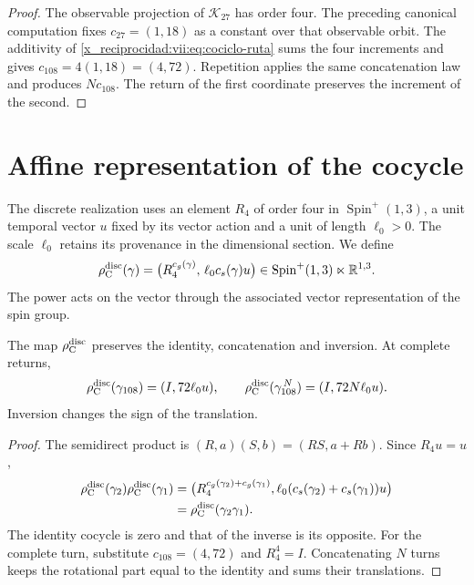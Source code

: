 \begin{proof}
The observable projection of \(\mathcal K_{27}\) has order four.
The preceding canonical computation fixes \(c_{27}=(1,18)\) as a constant
over that observable orbit. The additivity of
\eqref{x_reciprocidad:vii:eq:cociclo-ruta} sums the four increments and gives
\(c_{108}=4(1,18)=(4,72)\).
Repetition applies the same concatenation law and produces
\(Nc_{108}\). The return of the first coordinate preserves the
increment of the second.
\end{proof}

\section{Affine representation of the cocycle}
\label{x_reciprocidad:vii:subsec:representacion-afin-cociclo}

The discrete realization uses an element \(R_4\) of order four in
\(\operatorname{Spin}^+(1,3)\), a unit temporal vector \(u\)
fixed by its vector action and a unit of length \(\ell_0>0\).
The scale \(\ell_0\) retains its provenance in the dimensional section.
We define
\begin{equation}
 \rho_{\rm C}^{\rm disc}(\gamma)=
 \bigl(R_4^{c_g(\gamma)},\,\ell_0c_s(\gamma)u\bigr)
 \in\operatorname{Spin}^+(1,3)\ltimes\mathbb R^{1,3}.
 \label{x_reciprocidad:vii:eq:representacion-discreta-memoria}
\end{equation}
The power acts on the vector through the associated vector
representation of the spin group.

\begin{theorem}
\label{x_reciprocidad:vii:thm:traslacion-memoria}
The map \(\rho_{\rm C}^{\rm disc}\) preserves the identity,
concatenation and inversion. At complete returns,
\begin{equation}
 \rho_{\rm C}^{\rm disc}(\gamma_{108})=(I,72\ell_0u),\qquad
 \rho_{\rm C}^{\rm disc}(\gamma_{108}^{\,N})=(I,72N\ell_0u).
 \label{x_reciprocidad:vii:eq:traslacion-retorno-108}
\end{equation}
Inversion changes the sign of the translation.
\end{theorem}

\begin{proof}
The semidirect product is
\((R,a)(S,b)=(RS,a+Rb)\). Since \(R_4u=u\),
\[
\begin{split}
 \rho_{\rm C}^{\rm disc}(\gamma_2)
 \rho_{\rm C}^{\rm disc}(\gamma_1)
 &=
 \bigl(R_4^{c_g(\gamma_2)+c_g(\gamma_1)},
 \ell_0(c_s(\gamma_2)+c_s(\gamma_1))u\bigr)\\
 &=\rho_{\rm C}^{\rm disc}(\gamma_2\gamma_1).
\end{split}
\]
The identity cocycle is zero and that of the inverse is its opposite.
For the complete turn, substitute \(c_{108}=(4,72)\) and
\(R_4^4=I\). Concatenating \(N\) turns keeps the rotational part
equal to the identity and sums their translations.
\end{proof}

